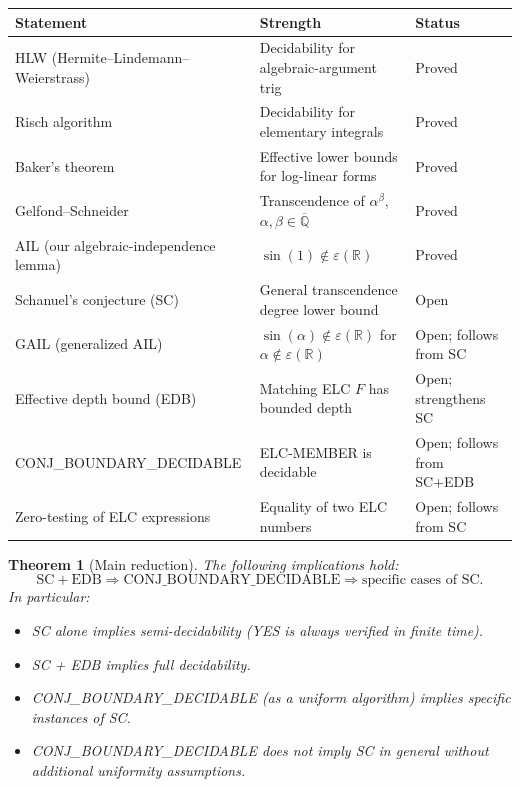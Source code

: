 \documentclass[11pt]{article}
\newtheorem{theorem}{Theorem}
\begin{document}
\begin{center}
\renewcommand{\arraystretch}{1.3}
\begin{tabular}{lll}
\toprule
Statement & Strength & Status \\
\midrule
HLW (Hermite--Lindemann--Weierstrass) & Decidability for algebraic-argument trig & Proved \\
Risch algorithm & Decidability for elementary integrals & Proved \\
Baker's theorem & Effective lower bounds for log-linear forms & Proved \\
Gelfond--Schneider & Transcendence of $\alpha^\beta$, $\alpha,\beta\in\overline{\mathbb{Q}}$ & Proved \\
\midrule
AIL (our algebraic-independence lemma) & $\sin(1)\notin\varepsilon(\mathbb{R})$ & Proved \\
\midrule
Schanuel's conjecture (SC) & General transcendence degree lower bound & Open \\
GAIL (generalized AIL) & $\sin(\alpha)\notin\varepsilon(\mathbb{R})$ for $\alpha\notin\varepsilon(\mathbb{R})$ & Open; follows from SC \\
Effective depth bound (EDB) & Matching ELC $F$ has bounded depth & Open; strengthens SC \\
\midrule
CONJ\_BOUNDARY\_DECIDABLE & ELC-MEMBER is decidable & Open; follows from SC+EDB \\
Zero-testing of ELC expressions & Equality of two ELC numbers & Open; follows from SC \\
\bottomrule
\end{tabular}
\end{center}

\begin{theorem}[Main reduction]
\label{thm:main}
The following implications hold:
\[
\mathrm{SC} + \mathrm{EDB} \Rightarrow \mathrm{CONJ\_BOUNDARY\_DECIDABLE} \Rightarrow \text{specific cases of SC}.
\]
In particular:
\begin{itemize}
  \item SC alone implies semi-decidability (YES is always verified in finite time).
  \item SC + EDB implies full decidability.
  \item CONJ\_BOUNDARY\_DECIDABLE (as a uniform algorithm) implies specific instances of SC.
  \item CONJ\_BOUNDARY\_DECIDABLE does \emph{not} imply SC in general without additional
    uniformity assumptions.
\end{itemize}
\end{theorem}
\end{document}
